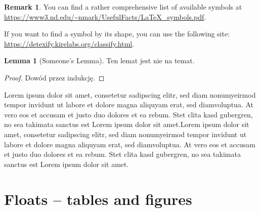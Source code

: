 \documentclass[a4paper,11pt,twoside]{report}
\theoremstyle{definition}
\newtheorem{lemma}[theorem]{Lemma}
\newtheorem{remark}[theorem]{Remark}
\begin{document}
\begin{remark}
    You can find a rather comprehensive list of available symbols at \url{https://www3.nd.edu/~nmark/UsefulFacts/LaTeX_symbols.pdf}.

    If you want to find a symbol by its shape, you can use the following site: \url{https://detexify.kirelabs.org/classify.html}.
\end{remark}

\begin{lemma}[Someone's Lemma]
    Ten lemat jest nie na temat.
\end{lemma}
\begin{proof} Dowód przez indukcję.
\end{proof}


Lorem ipsum dolor sit amet, consetetur sadipscing elitr, sed diam nonumyeirmod tempor invidunt ut labore et dolore magna aliquyam erat, sed diamvoluptua. At vero eos et accusam et justo duo dolores et ea rebum. Stet clita kasd gubergren, no sea takimata sanctus est Lorem ipsum dolor sit amet.Lorem ipsum dolor sit amet, consetetur sadipscing elitr, sed diam nonumyeirmod tempor invidunt ut labore et dolore magna aliquyam erat, sed diamvoluptua. At vero eos et accusam et justo duo dolores et ea rebum. Stet clita kasd gubergren, no sea takimata sanctus est Lorem ipsum dolor sit amet.



\section{Floats -- tables and figures}
\end{document}
